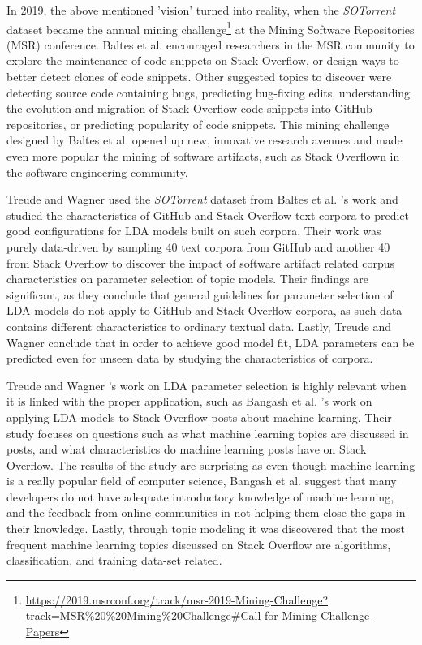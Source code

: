         In 2019, the above mentioned 'vision' turned into reality, when the \emph{SOTorrent} dataset became the annual mining challenge\footnote{\url{https://2019.msrconf.org/track/msr-2019-Mining-Challenge?track=MSR\%20\%20Mining\%20Challenge\#Call-for-Mining-Challenge-Papers}} at the Mining Software Repositories (MSR) conference. Baltes et al. \cite{baltes2019sotorrent} encouraged researchers in the MSR community to explore the maintenance of code snippets on Stack Overflow, or design ways to better detect clones of code snippets. Other suggested topics to discover were detecting source code containing bugs, predicting bug-fixing edits, understanding the evolution and migration of Stack Overflow code snippets into GitHub repositories, or predicting popularity of code snippets. This mining challenge designed by Baltes et al. \cite{baltes2019sotorrent} opened up new, innovative research avenues and made even more popular the mining of software artifacts, such as Stack Overflown in the software engineering community. 
        
        Treude and Wagner \cite{treude2019predicting} used the \emph{SOTorrent} dataset from Baltes et al. \cite{baltes2019sotorrent}'s work and studied the characteristics of GitHub and Stack Overflow text corpora to predict good configurations for LDA models built on such corpora. Their work was purely data-driven by sampling 40 text corpora from GitHub and another 40 from Stack Overflow to discover the impact of software artifact related corpus characteristics on parameter selection of topic models. Their findings are significant, as they conclude that general guidelines for parameter selection of LDA models do not apply to GitHub and Stack Overflow corpora, as such data contains different characteristics to ordinary textual data. Lastly, Treude and Wagner conclude that in order to achieve good model fit, LDA parameters can be predicted even for unseen data by studying the characteristics of corpora.
        
         Treude and Wagner \cite{treude2019predicting}'s work on LDA parameter selection is highly relevant when it is linked with the proper application, such as Bangash et al. \cite{bangash2019developers}'s work on applying LDA models to Stack Overflow posts about machine learning. Their study focuses on questions such as what machine learning topics are discussed in posts, and what characteristics do machine learning posts have on Stack Overflow. The results of the study are surprising as even though machine learning is a really popular field of computer science, Bangash et al. suggest that many developers do not have adequate introductory knowledge of machine learning, and the feedback from online communities in not helping them close the gaps in their knowledge. Lastly, through topic modeling it was discovered that the most frequent machine learning topics discussed on Stack Overflow are algorithms, classification, and training data-set related.
         
